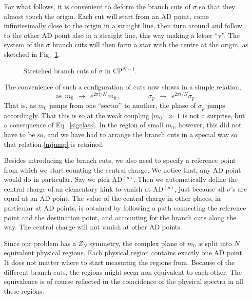 \documentclass[epsfig,12pt]{article}
\def\beq{\begin{equation}}
\def\eeq{\end{equation}}
\def\beq{\begin{equation}}
\def\eeq{\end{equation}}
\begin{document}
	For what follows, it is convenient to deform the branch cuts of $ \sigma $ so that they almost touch the origin.
	Each cut will start from an AD point, come infinitesimally close to the origin in a straight line, 
	then turn around and follow to the other AD point also in a straight line, this way making a letter ``v''.
	The system of the $ \sigma $ branch cuts will then form a star with the centre at the origin, as sketched in Fig.~\ref{fsigcpn}.
\begin{figure}
\begin{center}
\epsfxsize=8.0cm
\caption{Stretched branch cuts of $ \sigma $ in CP$^{N-1}$.}
\label{fsigcpn}
\end{center}
\end{figure}
	The convenience of such a configuration of cuts now shows in a simple relation,
\beq
\label{mjump}
	\text{as}~~ m_0 ~~\to~~ e^{2\pi i / N}\, m_0\,,  \qquad\qquad \sigma_p ~~\to~~ e^{2\pi i / N} \sigma_p\,.
\eeq
	That is, as $ m_0 $ jumps from one ``sector'' to another, the phase of $ \sigma_p $ jumps accordingly.
	That this is so at the weak coupling $ |m_0| \,\gg\, 1 $ is not a surprise, but a consequence of Eq.~\eqref{sigclass}.
	In the region of small $ m_0 $, however, this did not have to be so, and we have had to arrange the branch cuts 
	in a special way so that relation \eqref{mjump} is retained.

	Besides introducing the branch cuts, we also need to specify a reference point from which we start counting
	the central charge.
	We notice that, any AD point would do in particular.
	Say we pick AD$^{(p)}$.
	Then we automatically define the central charge of an elementary kink to vanish at AD$^{(p)}$,  just because
	all $ \sigma $'s are equal at an AD point.
	The value of the central charge in other places, in particular at AD points, is obtained by following
	a path connecting the reference point and the destination point, and accounting for the branch cuts
	along the way. 
	The central charge will not vanish at other AD points. 

	Since our problem has a $ Z_N $ symmetry, the complex plane of $ m_0 $ is split into $ N $ equivalent physical
	regions.
	Each physical region contains exactly one AD point.
	It does not matter where to start measuring the regions from.
	Because of the different branch cuts, the regions might seem non-equivalent to each other.
	The equivalence is of course reflected in the coincidence of the physical spectra in all these regions. 
\end{document}
